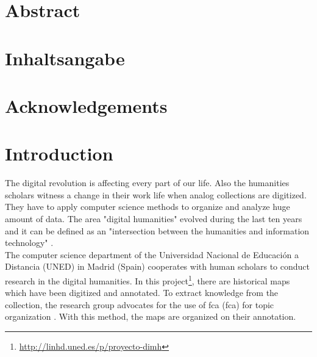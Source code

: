 \documentclass[11pt]{report}
\begin{document}


\renewcommand{\thepage}{\roman{page}}%

\newpage
\thispagestyle{empty}
\mbox{}

\chapter*{Abstract}
\blindtext

\newpage
\thispagestyle{empty}
\mbox{}

\chapter*{Inhaltsangabe}
\blindtext

\newpage
\thispagestyle{empty}
\mbox{}

\chapter*{Acknowledgements}
\blindtext

\newpage
\thispagestyle{empty}
\mbox{}

\tableofcontents
\newpage

\printglossary[type=\acronymtype]

\newpage
\thispagestyle{empty}
\mbox{}


\chapter{Introduction}

\renewcommand{\thepage}{\arabic{page}}
\setcounter{page}{1}

The digital revolution is affecting every part of our life. Also the humanities scholars witness a change in their work life when analog collections are digitized. They have to apply computer science methods to organize and analyze huge amount of data. The area "digital humanities" evolved during the last ten years and it can be defined as an "intersection between the humanities and information technology" \cite{Svensson2010}.\\

 The computer science department of the Universidad Nacional de Educación a Distancia (UNED) in Madrid (Spain) cooperates with human scholars to conduct research in the digital humanities. In this project\footnote{\url{http://linhd.uned.es/p/proyecto-dimh}}, there are historical maps which have been digitized and annotated. To extract knowledge from the collection, the research group advocates for the use of \acrlong{fca} (\acrshort{fca}) for topic organization \cite{Castellanos,Cigarran}. With this method, the maps are organized on their annotation.\\
 
\end{document}
